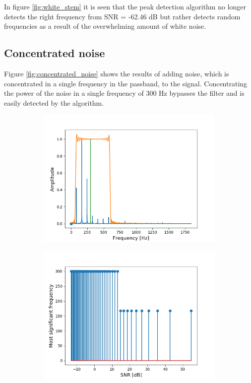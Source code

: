 In figure \ref{fig:white_stem} it is seen that the peak detection algorithm no longer detects the right frequency from SNR = -62.46 dB but rather detects random frequencies as a result of the overwhelming amount of white noise.

\subsection{Concentrated noise}
Figure \ref{fig:concentrated_noise} shows the results of adding noise, which is concentrated in a single frequency in the passband, to the signal. Concentrating the power of the noise in a single frequency of 300 Hz bypasses the filter and is easily detected by the algorithm.

\begin{figure}[H]
\begin{subfigure}{0.49\textwidth}
\centering
\includegraphics[width=\textwidth]{figures/SNR/concentrated_spectrum.png}
\caption{}
\label{fig:concentrated_spectrum}
\end{subfigure}
\begin{subfigure}{0.49\textwidth}
\centering
\includegraphics[width=\textwidth]{figures/SNR/concentrated_stem.png}

\end{subfigure}
\end{figure}
